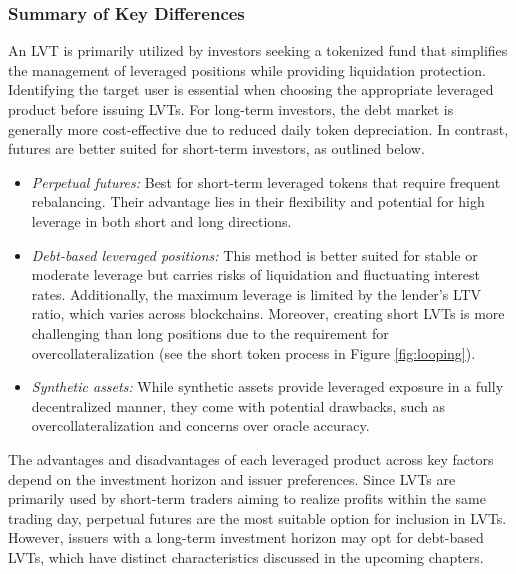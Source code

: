 \subsubsection{Summary of Key Differences}\label{appx:summary}
An LVT is primarily utilized by investors seeking a tokenized fund that simplifies the management of leveraged positions while providing liquidation protection. Identifying the target user is essential when choosing the appropriate leveraged product before issuing LVTs. For long-term investors, the debt market is generally more cost-effective due to reduced daily token depreciation. In contrast, futures are better suited for short-term investors, as outlined below.
\begin{itemize}
	\item \textit{Perpetual futures:} Best for short-term leveraged tokens that require frequent rebalancing. Their advantage lies in their flexibility and potential for high leverage in both short and long directions.
	
	\item \textit{Debt-based leveraged positions:} This method is better suited for stable or moderate leverage but carries risks of liquidation and fluctuating interest rates. Additionally, the maximum leverage is limited by the lender's LTV ratio, which varies across blockchains. Moreover, creating short LVTs is more challenging than long positions due to the requirement for overcollateralization (see the short token process in Figure \ref{fig:looping}).
	
	\item \textit{Synthetic assets:} While synthetic assets provide leveraged exposure in a fully decentralized manner, they come with potential drawbacks, such as overcollateralization and concerns over oracle accuracy.
\end{itemize}
The advantages and disadvantages of each leveraged product across key factors depend on the investment horizon and issuer preferences. Since LVTs are primarily used by short-term traders aiming to realize profits within the same trading day, perpetual futures are the most suitable option for inclusion in LVTs. However, issuers with a long-term investment horizon may opt for debt-based LVTs, which have distinct characteristics discussed in the upcoming chapters.

